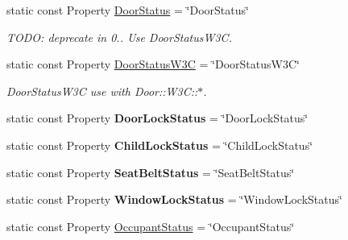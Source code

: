 \begin{DoxyCompactItemize}
\item 
\hypertarget{classVehicleProperty_aec1cd341d1eda388b27e5e2c167f377b}{static const Property \hyperlink{classVehicleProperty_aec1cd341d1eda388b27e5e2c167f377b}{Door\+Status} = \char`\"{}Door\+Status\char`\"{}}\label{classVehicleProperty_aec1cd341d1eda388b27e5e2c167f377b}

\begin{DoxyCompactList}\small\item\em T\+O\+D\+O\+: deprecate in 0.. Use Door\+Status\+W3\+C. \end{DoxyCompactList}\item 
\hypertarget{classVehicleProperty_a43535323827c54d73fe8e7b68f131f79}{static const Property \hyperlink{classVehicleProperty_a43535323827c54d73fe8e7b68f131f79}{Door\+Status\+W3\+C} = \char`\"{}Door\+Status\+W3\+C\char`\"{}}\label{classVehicleProperty_a43535323827c54d73fe8e7b68f131f79}

\begin{DoxyCompactList}\small\item\em Door\+Status\+W3\+C use with Door\+::\+W3\+C\+:\+:$\ast$. \end{DoxyCompactList}\item 
\hypertarget{classVehicleProperty_a3d6b7274ee30b454864351c1c91bf694}{static const Property {\bfseries Door\+Lock\+Status} = \char`\"{}Door\+Lock\+Status\char`\"{}}\label{classVehicleProperty_a3d6b7274ee30b454864351c1c91bf694}

\item 
\hypertarget{classVehicleProperty_a8da7bc1ecdd1b8d0ca6e96a708b00ab2}{static const Property {\bfseries Child\+Lock\+Status} = \char`\"{}Child\+Lock\+Status\char`\"{}}\label{classVehicleProperty_a8da7bc1ecdd1b8d0ca6e96a708b00ab2}

\item 
\hypertarget{classVehicleProperty_a6189236af616f7e8326ccb1b45d005c4}{static const Property {\bfseries Seat\+Belt\+Status} = \char`\"{}Seat\+Belt\+Status\char`\"{}}\label{classVehicleProperty_a6189236af616f7e8326ccb1b45d005c4}

\item 
\hypertarget{classVehicleProperty_aa2db4c5710bc329bf294102a628e7c37}{static const Property {\bfseries Window\+Lock\+Status} = \char`\"{}Window\+Lock\+Status\char`\"{}}\label{classVehicleProperty_aa2db4c5710bc329bf294102a628e7c37}

\item 
\hypertarget{classVehicleProperty_a581909689c6ad9ffea21a4de61109150}{static const Property \hyperlink{classVehicleProperty_a581909689c6ad9ffea21a4de61109150}{Occupant\+Status} = \char`\"{}Occupant\+Status\char`\"{}}\label{classVehicleProperty_a581909689c6ad9ffea21a4de61109150}


\end{DoxyCompactItemize}
